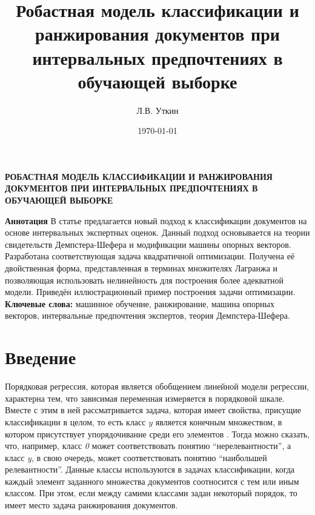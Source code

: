 \documentclass[12pt,a4paper,oneside]{article}
\title{Робастная модель классификации и ранжирования документов при интервальных предпочтениях в обучающей выборке}
\author{Л.В. Уткин}
\date{\today}
\begin{document}

\ApplyCommonPageStyle


\begin{center}
\textbf{\large РОБАСТНАЯ МОДЕЛЬ КЛАССИФИКАЦИИ И РАНЖИРОВАНИЯ ДОКУМЕНТОВ ПРИ ИНТЕРВАЛЬНЫХ ПРЕДПОЧТЕНИЯХ В ОБУЧАЮЩЕЙ ВЫБОРКЕ}
\end{center}
\vspace{2em}
{\footnotesize %
\textbf{Аннотация} В статье предлагается новый подход к классификации документов на основе интервальных экспертных оценок. 
Данный подход основывается на теории свидетельств Демпстера-Шефера и модификации машины опорных векторов. 
Разработана соответствующая задача квадратичной оптимизации. 
Получена её двойственная форма, представленная в терминах множителях Лагранжа и позволяющая использовать нелинейность для построения более адекватной модели. 
Приведён иллюстрационный пример построения задачи оптимизации. 
\newline
\textbf{Ключевые слова:} машинное обучение, ранжирование, машина опорных векторов, интервальные предпочтения экспертов, теория Демпстера-Шефера.
%
}


\section{Введение}
\label{sec:introduction}

\par
Порядковая регрессия, которая является обобщением линейной модели регрессии, характерна тем, что зависимая переменная измеряется в порядковой шкале. 
Вместе с этим в ней рассматривается задача, которая имеет свойства, присущие классификации в целом, то есть класс $y$ является конечным множеством, в котором присутствует упорядочивание среди его элементов .
Тогда можно сказать, что, например, класс \emph{0} может соответствовать понятию ``нерелевантности'', а класс \emph{y}, в свою очередь, может соответствовать понятию ``наибольшей релевантности''. 
Данные классы используются в задачах классификации, когда каждый элемент заданного множества документов соотносится с тем или иным классом. 
При этом, если между самими классами задан некоторый порядок, то имеет место задача ранжирования документов. 
\end{document}
